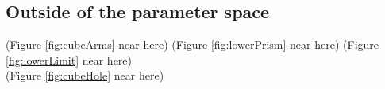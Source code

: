 \documentclass[suppldata, dvipdfmx]{interact}
\theoremstyle{plain}%
\theoremstyle{definition}
\theoremstyle{remark}
\theoremstyle{problemstyle}
\begin{document}
%
%
%
%

\subsection{Outside of the parameter space}

\noindent(Figure \ref{fig:cubeArms} near here)
(Figure \ref{fig:lowerPrism} near here)
(Figure \ref{fig:lowerLimit} near here)\\
(Figure \ref{fig:cubeHole}
 near here)
\end{document}
